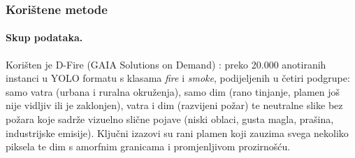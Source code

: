 \subsubsection{Korištene metode}
\paragraph{Skup podataka.} Korišten je D-Fire (GAIA Solutions on Demand) \cite{dfire}: preko 20.000 anotiranih instanci u YOLO formatu s klasama \emph{fire} i \emph{smoke}, podijeljenih u četiri podgrupe: samo vatra (urbana i ruralna okruženja), samo dim (rano tinjanje, plamen još nije vidljiv ili je zaklonjen), vatra i dim (razvijeni požar) te neutralne slike bez požara koje sadrže vizuelno slične pojave (niski oblaci, gusta magla, prašina, industrijske emisije). Ključni izazovi su rani plamen koji zauzima svega nekoliko piksela te dim s amorfnim granicama i promjenljivom prozirnošću.

